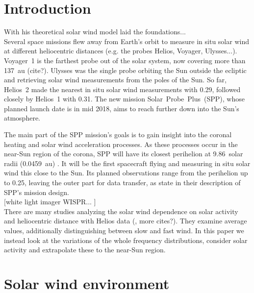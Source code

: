 \section{Introduction}

With his theoretical solar wind model \citet{Parker1958} laid the foundations...\\

Several space missions flew away from Earth's orbit to measure in situ solar wind at different heliocentric distances (e.g. the probes Helios, Voyager, Ulysses...). Voyager~1 is the farthest probe out of the solar system, now covering more than 137~au (cite?). Ulysses was the single probe orbiting the Sun outside the ecliptic and retrieving solar wind measurements from the poles of the Sun. So far, Helios~2 made the nearest in situ solar wind measurements with \SI{0.29}{\au}, followed closely by Helios~1 with \SI{0.31}{\au}. The new mission Solar~Probe~Plus~(SPP), whose planned launch date is in mid 2018, aims to reach further down into the Sun's atmosphere.

The main part of the SPP mission's goals is to gain insight into the coronal heating and solar wind acceleration processes. As these processes occur in the near-Sun region of the corona, SPP will have its closest perihelion at 9.86~solar radii (0.0459~au) \citep{Fox2015}. It will be the first spacecraft flying and measuring in situ solar wind this close to the Sun. Its planned observations range from the perihelion up to \SI{0.25}{\au}, leaving the outer part for data transfer, as \citet{Fox2015} state in their description of SPP's mission design.\\

[white light imager WISPR... \citep{Vourlidas2016}]\\

There are many studies analyzing the solar wind dependence on solar activity and heliocentric distance with Helios data (\citet{Schwenn1983, Bougeret1984, Schwenn1990}, more cites?). They examine average values, additionally distinguishing between slow and fast wind. In this paper we instead look at the variations of the whole frequency distributions, consider solar activity and extrapolate these to the near-Sun region.\\


\section{Solar wind environment}

